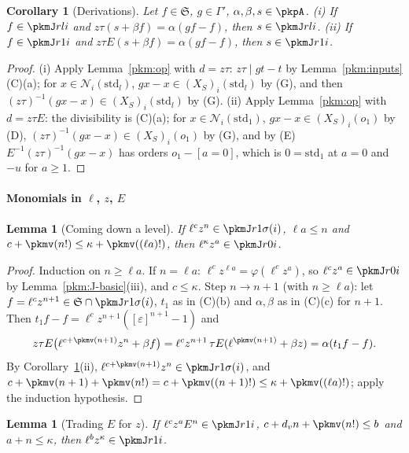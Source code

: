 \documentclass[10pt]{amsart}
\newtheorem{lemma}[theorem]{Lemma}
\newtheorem{corollary}[theorem]{Corollary}
\theoremstyle{definition}
\theoremstyle{remark}
\begin{document}
\begin{corollary}[Derivations]\label{pkm:der}
Let $f\in\mathfrak S$, $g\in\Gamma'$, $\alpha,\beta,s\in\pkpA$. (i) If $f\in\pkmJ rli$ and
$z\tau(s+\beta f)=\alpha(gf-f)$, then $s\in\pkmJ rli$. (ii) If $f\in\pkmJ r1i$ and $z\tau E(s+\beta
f)=\alpha(gf-f)$, then $s\in\pkmJ r1i$.
\end{corollary}

\begin{proof}
(i) Apply Lemma~\ref{pkm:op} with $d=z\tau$: $z\tau\mid gt-t$ by Lemma~\ref{pkm:inputs}(C)(a); for
$x\in\mathcal N_i(\mathrm{std}_l)$, $gx-x\in(X_S)_i(\mathrm{std}_l)$ by (G), and then $(z\tau)^{-1}(gx-x)\in
(X_S)_i(\mathrm{std}_l)$ by (G). (ii) Apply Lemma~\ref{pkm:op} with $d=z\tau E$: the divisibility is
(C)(a); for $x\in\mathcal N_i(\mathrm{std}_1)$, $gx-x\in(X_S)_i(o_1)$ by (D), $(z\tau)^{-1}(gx-x)\in
(X_S)_i(o_1)$ by (G), and by (E) $E^{-1}(z\tau)^{-1}(gx-x)$ has orders $o_1-[a=0]$, which is
$0=\mathrm{std}_1$ at $a=0$ and $-u$ for $a\ge1$.
\end{proof}

\paragraph*{Monomials in $\ell$, $z$, $E$}

\begin{lemma}[Coming down a level]\label{pkm:down-level}
If $\ell^cz^n\in\pkmJ r1{\sigma(i)}$, $\ell a\le n$ and $c+\pkmv(n!)\le\kappa+\pkmv((\ell a)!)$, then
$\ell^\kappa z^a\in\pkmJ r0i$.
\end{lemma}

\begin{proof}
Induction on $n\ge\ell a$. If $n=\ell a$: $\ell^cz^{\ell a}=\varphi(\ell^cz^a)$, so $\ell^cz^a\in\pkmJ r0i$
by Lemma~\ref{pkm:J-basic}(iii), and $c\le\kappa$. Step $n\to n+1$ (with $n\ge\ell a$): let
$f=\ell^cz^{n+1}\in\mathfrak S\cap\pkmJ r1{\sigma(i)}$, $t_1$ as in (C)(b) and $\alpha,\beta$ as in
(C)(c) for $n+1$. Then $t_1f-f=\ell^cz^{n+1}([\varepsilon]^{n+1}-1)$ and
\[
z\tau E\bigl(\ell^{c+\pkmv(n+1)}z^n+\beta f\bigr)=\ell^cz^{n+1}\,\tau E(\ell^{\pkmv(n+1)}+\beta z)=
\alpha(t_1f-f).
\]
By Corollary~\ref{pkm:der}(ii), $\ell^{c+\pkmv(n+1)}z^n\in\pkmJ r1{\sigma(i)}$, and
$c+\pkmv(n+1)+\pkmv(n!)=c+\pkmv((n+1)!)\le\kappa+\pkmv((\ell a)!)$; apply the induction hypothesis.
\end{proof}

\begin{lemma}[Trading $E$ for $z$]\label{pkm:trade}
If $\ell^cz^aE^n\in\pkmJ r1i$, $c+d_vn+\pkmv(n!)\le b$ and $a+n\le\kappa$, then $\ell^bz^\kappa\in\pkmJ r1i$.
\end{lemma}
\end{document}
